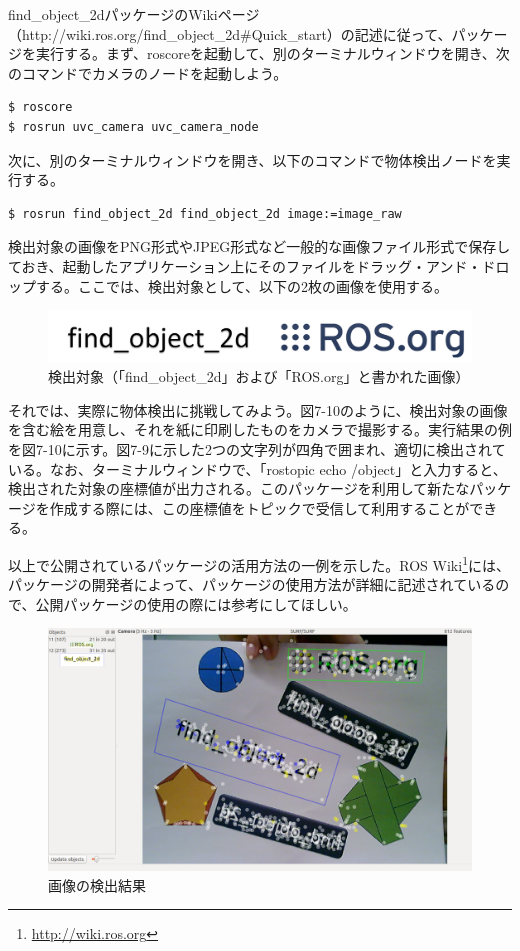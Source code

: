 find\_object\_2dパッケージのWikiページ（http://wiki.ros.org/find\_object\_2d#Quick\_start）の記述に従って、パッケージを実行する。まず、roscoreを起動して、別のターミナルウィンドウを開き、次のコマンドでカメラのノードを起動しよう。

\begin{lstlisting}[language=ROS]
$ roscore
$ rosrun uvc_camera uvc_camera_node
\end{lstlisting}

次に、別のターミナルウィンドウを開き、以下のコマンドで物体検出ノードを実行する。

\begin{lstlisting}[language=ROS]
$ rosrun find_object_2d find_object_2d image:=image_raw
\end{lstlisting}

検出対象の画像をPNG形式やJPEG形式など一般的な画像ファイル形式で保存しておき、起動したアプリケーション上にそのファイルをドラッグ・アンド・ドロップする。ここでは、検出対象として、以下の2枚の画像を使用する。

\begin{figure}[htp]
  \centering
  \includegraphics[width=12cm]{pictures/chapter7/pic_07_09.png}
  \caption{検出対象（「find\_object\_2d」および「ROS.org」と書かれた画像）}
\end{figure}

それでは、実際に物体検出に挑戦してみよう。図7-10のように、検出対象の画像を含む絵を用意し、それを紙に印刷したものをカメラで撮影する。実行結果の例を図7-10に示す。図7-9に示した2つの文字列が四角で囲まれ、適切に検出されている。なお、ターミナルウィンドウで、「rostopic echo /object」と入力すると、検出された対象の座標値が出力される。このパッケージを利用して新たなパッケージを作成する際には、この座標値をトピックで受信して利用することができる。

以上で公開されているパッケージの活用方法の一例を示した。ROS Wiki\footnote{\url{http://wiki.ros.org}}には、パッケージの開発者によって、パッケージの使用方法が詳細に記述されているので、公開パッケージの使用の際には参考にしてほしい。

\begin{figure}[htp]
  \centering
  \includegraphics[width=15cm]{pictures/chapter7/pic_07_10.png}
  \caption{画像の検出結果}
\end{figure}

